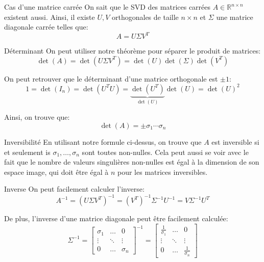\documentclass[a4paper]{article}
\begin{document}
\begin{parag}{Cas d'une matrice carrée}
    On sait que le SVD des matrices carrées $A \in \mathbb{R}^{n \times n}$ existent aussi. Ainsi, il existe $U, V$ orthogonales de taille $n \times n$ et $\Sigma$ une matrice diagonale carrée telles que: 
    \[A = U\Sigma V^T\]
    
    \begin{subparag}{Déterminant}
        On peut utiliser notre théorème pour séparer le produit de matrices: 
        \[\det\left(A\right) = \det\left(U \Sigma V^T\right) = \det\left(U\right)\det\left(\Sigma\right)\det\left(V^T\right)\]
        
        On peut retrouver que le déterminant d'une matrice orthogonale est $\pm 1$:
        \[1 = \det\left(I_n\right) = \det\left(U^T U\right) = \underbrace{\det\left(U^T\right)}_{\det\left(U\right)}\det\left(U\right) = \det\left(U\right)^2\]

        Ainsi, on trouve que: 
        \[\det\left(A\right) = \pm \sigma_1 \cdots \sigma_n\]
    \end{subparag}
    
    \begin{subparag}{Inversibilité}
        En utilisant notre formule ci-dessus, on trouve que $A$ est inversible si et seulement is $\sigma_1, \ldots, \sigma_n$ sont toutes non-nulles. Cela peut aussi se voir avec le fait que le nombre de valeurs singulières non-nulles est égal à la dimension de son espace image, qui doit être égal à $n$ pour les matrices inversibles.
    \end{subparag}

    \begin{subparag}{Inverse}
        On peut facilement calculer l'inverse: 
        \[A^{-1} = \left(U \Sigma V^T\right)^{-1} = \left(V^T\right)^{-1} \Sigma^{-1} U^{-1} = V \Sigma^{-1} U^T\]
        
        De plus, l'inverse d'une matrice diagonale peut être facilement calculée: 
        \[\Sigma^{-1} = \begin{bmatrix} \sigma_1 & \ldots & 0 \\ \vdots & \ddots & \vdots \\ 0 & \ldots & \sigma_n \end{bmatrix}^{-1} = \begin{bmatrix} \frac{1}{\sigma_1} & \ldots & 0 \\ \vdots & \ddots & \vdots \\ 0 & \ldots & \frac{1}{\sigma_n} \end{bmatrix}\]
    \end{subparag}


\end{parag}
\end{document}
